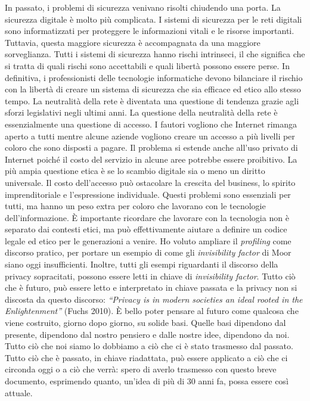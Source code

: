 In passato, i problemi di sicurezza venivano risolti chiudendo una porta. La sicurezza digitale è molto più complicata. I sistemi di sicurezza per le reti digitali sono informatizzati per proteggere le informazioni vitali e le risorse importanti. Tuttavia, questa maggiore sicurezza è accompagnata da una maggiore sorveglianza. Tutti i sistemi di sicurezza hanno rischi intrinseci, il che significa che si tratta di quali rischi sono accettabili e quali libertà possono essere perse. In definitiva, i professionisti delle tecnologie informatiche devono bilanciare il rischio con la libertà di creare un sistema di sicurezza che sia efficace ed etico allo stesso tempo.
La neutralità della rete è diventata una questione di tendenza grazie agli sforzi legislativi negli ultimi anni. La questione della neutralità della rete è essenzialmente una questione di accesso. I fautori vogliono che Internet rimanga aperto a tutti mentre alcune aziende vogliono creare un accesso a più livelli per coloro che sono disposti a pagare. Il problema si estende anche all'uso privato di Internet poiché il costo del servizio in alcune aree potrebbe essere proibitivo. La più ampia questione etica è se lo scambio digitale sia o meno un diritto universale. Il costo dell'accesso può ostacolare la crescita del business, lo spirito imprenditoriale e l'espressione individuale.
Questi problemi sono essenziali per tutti, ma hanno un peso extra per coloro che lavorano con le tecnologie dell'informazione. È importante ricordare che lavorare con la tecnologia non è separato dai contesti etici, ma può effettivamente aiutare a definire un codice legale ed etico per le generazioni a venire.
Ho voluto ampliare il \textit{profiling} come discorso pratico, per portare un esempio di come gli \textit{invisibility factor} di Moor siano oggi insufficienti. Inoltre, tutti gli esempi riguardanti il discorso della privacy sopracitati, possono essere letti in chiave di \textit{invisibility factor}. Tutto ciò che è futuro, può essere letto e interpretato in chiave passata e la privacy non si discosta da questo discorso: \textit{“Privacy is in modern societies an ideal rooted in the Enlightenment”} (Fuchs 2010).
È bello poter pensare al futuro come qualcosa che viene costruito, giorno dopo giorno, su solide basi. Quelle basi dipendono dal presente, dipendono dal nostro pensiero e dalle nostre idee, dipendono da noi. Tutto ciò che noi siamo lo dobbiamo a ciò che ci è stato trasmesso dal passato. Tutto ciò che è passato, in chiave riadattata, può essere applicato a ciò che ci circonda oggi o a ciò che verrà: spero di averlo trasmesso con questo breve documento, esprimendo quanto, un’idea di più di 30 anni fa, possa essere così attuale.